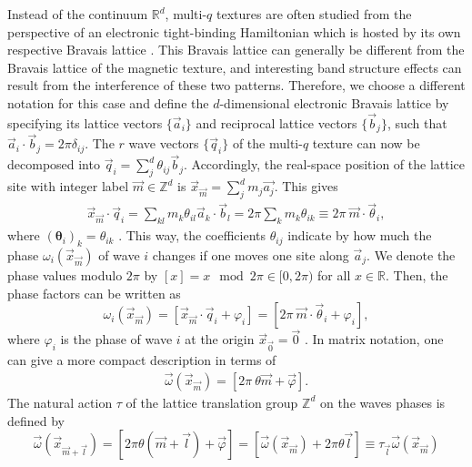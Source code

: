 \documentclass[submission, Phys]{SciPost}
\begin{document}
Instead of the continuum $\mathbb{R}^d$, multi-$q$ textures are often studied from the perspective of an electronic tight-binding Hamiltonian which is hosted by its own respective Bravais lattice \cite{Hamamoto2015, Gobel2017}. 
This Bravais lattice can generally be different from the Bravais lattice of the magnetic texture, and interesting band structure effects can result from the interference of these two patterns.
Therefore, we choose a different notation for this case and define the $d$-dimensional electronic Bravais lattice by specifying its lattice vectors $\{\vec{a}_i\}$ and reciprocal lattice vectors $\{\vec{b}_j\}$, such that $\vec{a}_i\cdot \vec{b}_j=2\pi\delta_{ij}$.
The $r$ wave vectors $\{\vec{q}_i\}$ of the multi-$q$ texture can now be decomposed into $\vec{q}_i=\sum_j^d \theta_{ij} \vec{b}_j$. 
Accordingly, the real-space position of the lattice site with integer label $\vec{m}\in\mathbb{Z}^d$ is $\vec{x}_{\vec{m}}=\sum_j^d m_j \vec{a_j}$.
This gives
\begin{align}
     \vec{x}_{\vec{m}} \cdot \vec{q}_i 
   = \sum_{kl} m_k \theta_{il} \vec{a}_k \cdot \vec{b}_l 
   = 2\pi \sum_{k} m_k \theta_{ik}  \equiv 2\pi ~\vec{m}\cdot \vec{\theta}_i,
\end{align}
where $(\boldsymbol{\theta}_i)_k=\theta_{ik}$ .
This way, the coefficients $\theta_{ij}$ indicate by how much the phase $\omega_i(\vec{x}_{\vec{m}})$ of wave $i$ changes if one moves one site along $\vec{a}_j$.
We denote the phase values modulo $2\pi$ by $[x] = x \mod 2\pi  \in [0,2\pi)$ for all $x\in \mathbb{R}$. 
Then, the phase factors can be written as
\begin{equation}
\omega_i(\vec{x}_{\vec{m}})=[\vec{x}_{\vec{m}}\cdot \vec{q}_i + \varphi_i ] = [2\pi~\vec{m}\cdot \vec{\theta}_i + \varphi_i ],
\end{equation}
where $\varphi_i$ is the phase of wave $i$ at the origin $\vec{x}_{\vec{0}}=\vec{0}$ \cite{Lux2024}.
In matrix notation, one can give a more compact description in terms of
\begin{align}
    \vec{\omega}(\vec{x}_{\vec{m}}) = [2\pi ~\theta  \vec{m} + \vec{\varphi}] .
\end{align}
The natural action $\tau$ of the lattice translation group $\mathbb{Z}^d$ on the waves phases is defined by
\begin{equation}
    \vec{\omega}(\vec{x}_{\vec{m}+\vec{l}})= [ 2\pi\theta(\vec{m}+\vec{l})  + \vec{\varphi} ]
    =
    [\vec{\omega}(\vec{x}_{\vec{m}}) + 2\pi \theta \vec{l} ]  \equiv \tau_{\vec{l}}  \vec{\omega}(\vec{x}_{\vec{m}})
    \label{eq:phasetranslations}
\end{equation}
\end{document}
